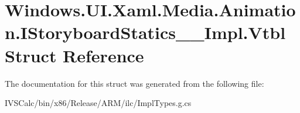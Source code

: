 \hypertarget{struct_windows_1_1_u_i_1_1_xaml_1_1_media_1_1_animation_1_1_i_storyboard_statics_____impl_1_1_vtbl}{}\section{Windows.\+U\+I.\+Xaml.\+Media.\+Animation.\+I\+Storyboard\+Statics\+\_\+\+\_\+\+Impl.\+Vtbl Struct Reference}
\label{struct_windows_1_1_u_i_1_1_xaml_1_1_media_1_1_animation_1_1_i_storyboard_statics_____impl_1_1_vtbl}


The documentation for this struct was generated from the following file\+:\begin{DoxyCompactItemize}
\item 
I\+V\+S\+Calc/bin/x86/\+Release/\+A\+R\+M/ilc/Impl\+Types.\+g.\+cs\end{DoxyCompactItemize}
